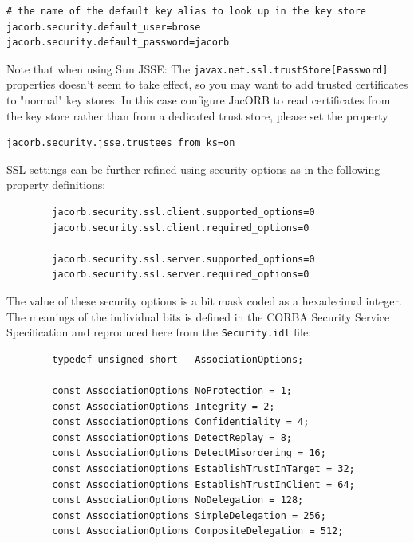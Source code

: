 \begin{verbatim}
# the name of the default key alias to look up in the key store
jacorb.security.default_user=brose
jacorb.security.default_password=jacorb
\end{verbatim}

Note that when using Sun JSSE: The {\tt javax.net.ssl.trustStore[Password]}
properties doesn't seem to take effect, so you may want to add trusted
certificates to "normal" key stores. In this case configure JacORB to read
certificates from the key store rather than from a dedicated trust
store, please set the property
\begin{verbatim}
jacorb.security.jsse.trustees_from_ks=on
\end{verbatim}

SSL settings can be further refined using security options as in
the following property definitions:

\begin{verbatim}
        jacorb.security.ssl.client.supported_options=0
        jacorb.security.ssl.client.required_options=0

        jacorb.security.ssl.server.supported_options=0
        jacorb.security.ssl.server.required_options=0
\end{verbatim}

The  value  of  these security  options  is  a  bit  mask coded  as  a
hexadecimal integer. The meanings of the individual bits is defined in
the CORBA Security Service  Specification and reproduced here from the
{\tt Security.idl} file:

\begin{verbatim}
        typedef unsigned short   AssociationOptions;

        const AssociationOptions NoProtection = 1;
        const AssociationOptions Integrity = 2;
        const AssociationOptions Confidentiality = 4;
        const AssociationOptions DetectReplay = 8;
        const AssociationOptions DetectMisordering = 16;
        const AssociationOptions EstablishTrustInTarget = 32;
        const AssociationOptions EstablishTrustInClient = 64;
        const AssociationOptions NoDelegation = 128;
        const AssociationOptions SimpleDelegation = 256;
        const AssociationOptions CompositeDelegation = 512;
\end{verbatim}


